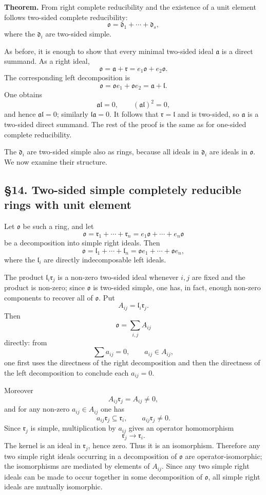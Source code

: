 \documentclass[11pt]{article}
\begin{document}
\textbf{Theorem.} From right complete reducibility and the existence of
a unit element follows two-sided complete reducibility: \[
  \mathfrak{o}=\mathfrak d_1+\cdots+\mathfrak d_s,
\] where the \(\mathfrak d_i\) are two-sided simple.

As before, it is enough to show that every minimal two-sided ideal
\(\mathfrak a\) is a direct summand. As a right ideal, \[
  \mathfrak{o}=\mathfrak a+\mathfrak r=e_1\mathfrak{o}+e_2\mathfrak{o}.
\] The corresponding left decomposition is \[
  \mathfrak{o}=\mathfrak{o}e_1+\mathfrak{o}e_2=\mathfrak a+\mathfrak l.
\] One obtains \[
  \mathfrak a\mathfrak l=0,
  \qquad
  (\mathfrak a\mathfrak l)^2=0,
\] and hence \(\mathfrak a\mathfrak l=0\); similarly
\(\mathfrak l\mathfrak a=0\). It follows that
\(\mathfrak r=\mathfrak l\) and is two-sided, so \(\mathfrak a\) is a
two-sided direct summand. The rest of the proof is the same as for
one-sided complete reducibility.

The \(\mathfrak d_i\) are two-sided simple also as rings, because all
ideals in \(\mathfrak d_i\) are ideals in \(\mathfrak{o}\). We now
examine their structure.

\subsection{§14. Two-sided simple completely reducible rings with unit
element}\label{two-sided-simple-completely-reducible-rings-with-unit-element}

Let \(\mathfrak{o}\) be such a ring, and let \[
  \mathfrak{o}=\mathfrak r_1+\cdots+\mathfrak r_n=e_1\mathfrak{o}+\cdots+e_n\mathfrak{o}
\] be a decomposition into simple right ideals. Then \[
  \mathfrak{o}=\mathfrak l_1+\cdots+\mathfrak l_n
      =\mathfrak{o}e_1+\cdots+\mathfrak{o}e_n,
\] where the \(\mathfrak l_i\) are directly indecomposable left ideals.

The product \(\mathfrak l_i\mathfrak r_j\) is a non-zero two-sided ideal
whenever \(i,j\) are fixed and the product is non-zero; since
\(\mathfrak{o}\) is two-sided simple, one has, in fact, enough non-zero
components to recover all of \(\mathfrak{o}\). Put \[
  A_{ij}=\mathfrak l_i\mathfrak r_j.
\] Then \[
  \mathfrak{o}=\sum_{i,j} A_{ij}
\] directly: from \[
  \sum a_{ij}=0,
  \qquad a_{ij}\in A_{ij},
\] one first uses the directness of the right decomposition and then the
directness of the left decomposition to conclude each \(a_{ij}=0\).

Moreover \[
  A_{ij}\mathfrak r_j=A_{ij}\ne0,
\] and for any non-zero \(a_{ij}\in A_{ij}\) one has \[
  a_{ij}\mathfrak r_j\subseteq\mathfrak r_i,
  \qquad
  a_{ij}\mathfrak r_j\ne0.
\] Since \(\mathfrak r_j\) is simple, multiplication by \(a_{ij}\) gives
an operator homomorphism \[
  \mathfrak r_j\to\mathfrak r_i.
\] The kernel is an ideal in \(\mathfrak r_j\), hence zero. Thus it is
an isomorphism. Therefore any two simple right ideals occurring in a
decomposition of \(\mathfrak{o}\) are operator-isomorphic; the
isomorphisms are mediated by elements of \(A_{ij}\). Since any two
simple right ideals can be made to occur together in some decomposition
of \(\mathfrak{o}\), all simple right ideals are mutually isomorphic.
\end{document}
